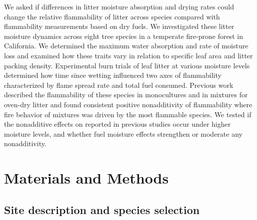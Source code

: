 \documentclass[letterpaper,12pt]{article}
\begin{document}
We asked if differences in litter moisture absorption and drying rates could
change the relative flammability of litter across species compared with
flammability measurements based on dry fuels. We investigated these litter
moisture dynamics across eight tree species in a temperate fire-prone forest in
California. We determined the maximum water absorption and rate of moisture
loss and examined how these traits vary in relation to specific leaf area and
litter packing density. Experimental burn trials of leaf litter at various
moisture levels determined how time since wetting influenced two axes of
flammability characterized by flame spread rate and total fuel consumed.
Previous work described the flammability of these species in monocultures and
in mixtures for oven-dry litter \citep{Magalhaes+Schwilk-2012} and found
consistent positive nonadditivity of flammability where fire behavior of
mixtures was driven by the most flammable species. We tested if the nonadditive
effects on reported in previous studies occur under higher moisture levels, and
whether fuel moisture effects strengthen or moderate any nonadditivity.


\section*{Materials and Methods}

\subsection*{Site description and species selection}
\end{document}
